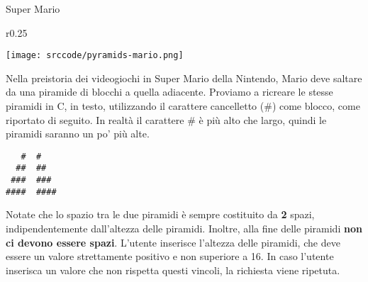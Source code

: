 \begin{labex}{Super Mario}

\begin{wrapfigure}{r}{0.25\textwidth}
  \begin{center}\vspace{-2em}
    \texttt{[image: srccode/pyramids-mario.png]}
  \end{center}\vspace{-8em}
\end{wrapfigure}



Nella preistoria dei videogiochi in Super Mario della Nintendo, Mario deve saltare da una piramide di blocchi a quella adiacente.
Proviamo a ricreare le stesse piramidi in C, in testo, utilizzando il carattere cancelletto ($\#$) come blocco, come riportato di seguito. In realt\`a il carattere $\#$ \`e pi\`u alto che largo, quindi le piramidi saranno un po' pi\`u alte.

\begin{verbatim}
   #  #
  ##  ##
 ###  ###
####  ####
\end{verbatim}

Notate che lo spazio tra le due piramidi \`e sempre costituito da \textbf{2} spazi, indipendentemente dall'altezza delle piramidi. Inoltre, alla fine delle piramidi \textbf{non ci devono essere spazi}.
L'utente inserisce l'altezza delle piramidi, che deve essere un valore strettamente positivo e non superiore a 16. In caso l'utente inserisca un valore che non rispetta questi vincoli, la richiesta viene ripetuta.

\begin{labexinout}
\end{labexinout}



\end{labex}

